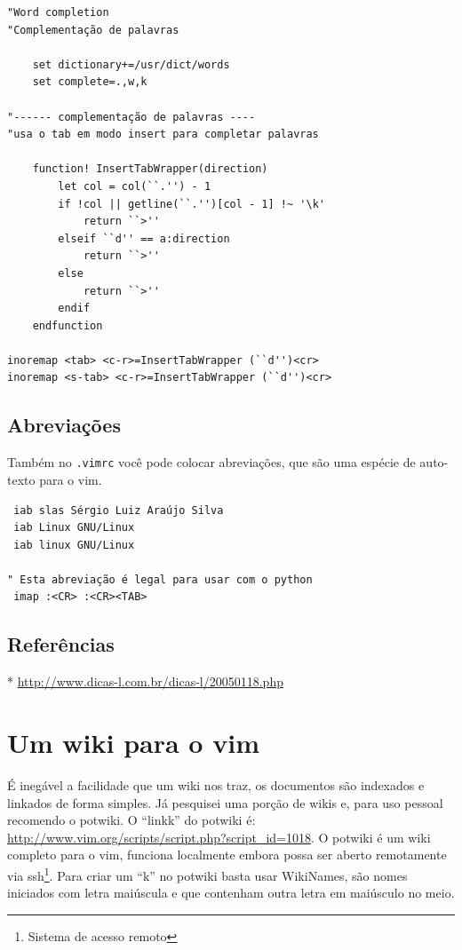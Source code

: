 \documentclass[10pt,a4paper,openany]{book}
\begin{document}
\begin{verbatim}
"Word completion
"Complementação de palavras

	set dictionary+=/usr/dict/words
	set complete=.,w,k

"------ complementação de palavras ----
"usa o tab em modo insert para completar palavras

	function! InsertTabWrapper(direction)
		let col = col(``.'') - 1
		if !col || getline(``.'')[col - 1] !~ '\k'
			return ``>''
		elseif ``d'' == a:direction
			return ``>''
		else
			return ``>''
		endif
	endfunction

inoremap <tab> <c-r>=InsertTabWrapper (``d'')<cr>
inoremap <s-tab> <c-r>=InsertTabWrapper (``d'')<cr>
\end{verbatim}

\section{Abreviações}\label{Abreviações}
Também no \verb|.vimrc| você pode colocar abreviações, que são uma espécie de
auto-texto para o vim.

\begin{verbatim}
 iab slas Sérgio Luiz Araújo Silva
 iab Linux GNU/Linux
 iab linux GNU/Linux

" Esta abreviação é legal para usar com o python
 imap :<CR> :<CR><TAB>
\end{verbatim}

\section{Referências}
\label{Referências}
* \url{http://www.dicas-l.com.br/dicas-l/20050118.php}

\chapter{Um wiki para o vim}\label{cha:Um wiki para o vim}

É inegável a facilidade que um wiki nos traz, os documentos são
indexados e linkados de forma simples. Já pesquisei uma porção de
wikis e, para uso pessoal recomendo o potwiki.  O ``linkk'' do potwiki é:
\url{http://www.vim.org/scripts/script.php?script_id=1018}.
O potwiki é um wiki completo para o vim, funciona localmente embora
possa ser aberto remotamente via ssh\footnote{Sistema de acesso remoto}.
Para criar um ``k'' no potwiki basta usar WikiNames, são nomes
iniciados com letra maiúscula e que contenham outra letra em maiúsculo
no meio. \\
\end{document}
